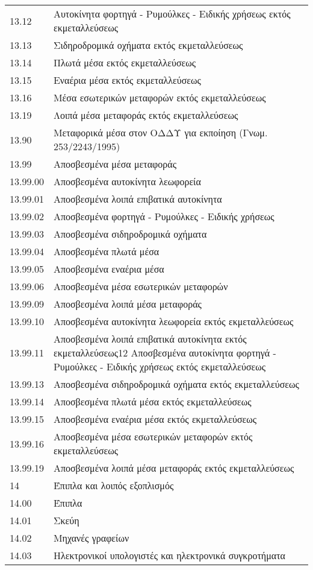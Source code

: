 \documentclass[A4,10pt,greek]{book}
\begin{document}
\begin{tabularx}{\linewidth}{lX}
13.12 & Αυτοκίνητα φορτηγά - Ρυμούλκες - Ειδικής χρήσεως εκτός εκμεταλλεύσεως\\
13.13 & Σιδηροδρομικά οχήματα εκτός εκμεταλλεύσεως\\
13.14 & Πλωτά μέσα εκτός εκμεταλλεύσεως\\
13.15 & Εναέρια μέσα εκτός εκμεταλλεύσεως\\
13.16 & Μέσα εσωτερικών μεταφορών εκτός εκμεταλλεύσεως\\
13.19 & Λοιπά μέσα μεταφοράς εκτός εκμεταλλεύσεως\\
13.90 & Μεταφορικά μέσα στον ΟΔΔΥ για εκποίηση (Γνωμ. 253/2243/1995)\\
13.99 & Αποσβεσμένα μέσα μεταφοράς\\
13.99.00 & Αποσβεσμένα αυτοκίνητα λεωφορεία\\
13.99.01 & Αποσβεσμένα λοιπά επιβατικά αυτοκίνητα\\
13.99.02 & Αποσβεσμένα φορτηγά - Ρυμούλκες - Ειδικής χρήσεως\\
13.99.03 & Αποσβεσμένα σιδηροδρομικά οχήματα\\
13.99.04 & Αποσβεσμένα πλωτά μέσα\\
13.99.05 & Αποσβεσμένα εναέρια μέσα\\
13.99.06 & Αποσβεσμένα μέσα εσωτερικών μεταφορών\\
13.99.09 & Αποσβεσμένα λοιπά μέσα μεταφοράς\\
13.99.10 & Αποσβεσμένα αυτοκίνητα λεωφορεία εκτός εκμεταλλεύσεως\\
13.99.11 & Αποσβεσμένα λοιπά επιβατικά αυτοκίνητα εκτός εκμεταλλεύσεως12 Αποσβεσμένα αυτοκίνητα φορτηγά - Ρυμούλκες - Ειδικής χρήσεως εκτός εκμεταλλεύσεως\\
13.99.13 & Αποσβεσμένα σιδηροδρομικά οχήματα εκτός εκμεταλλεύσεως\\
13.99.14 & Αποσβεσμένα πλωτά μέσα εκτός εκμεταλλεύσεως\\
13.99.15 & Αποσβεσμένα εναέρια μέσα εκτός εκμεταλλεύσεως\\
13.99.16 & Αποσβεσμένα μέσα εσωτερικών μεταφορών εκτός εκμεταλλεύσεως\\
13.99.19 & Αποσβεσμένα λοιπά μέσα μεταφοράς εκτός εκμεταλλεύσεως\\
14 & Έπιπλα και λοιπός εξοπλισμός\\
14.00 & Έπιπλα\\
14.01 & Σκεύη\\
14.02 & Μηχανές γραφείων\\
14.03 & Ηλεκτρονικοί υπολογιστές και ηλεκτρονικά συγκροτήματα\\

\end{tabularx}
\end{document}
